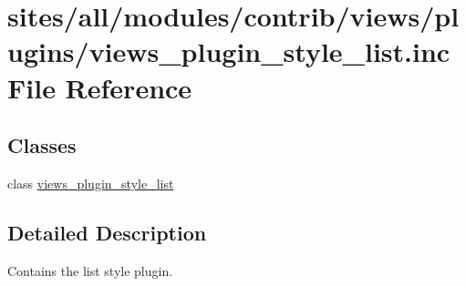 \hypertarget{views__plugin__style__list_8inc}{
\section{sites/all/modules/contrib/views/plugins/views\_\-plugin\_\-style\_\-list.inc File Reference}
\label{views__plugin__style__list_8inc}
}
\subsection*{Classes}
\begin{CompactItemize}
\item 
class \hyperlink{classviews__plugin__style__list}{views\_\-plugin\_\-style\_\-list}
\end{CompactItemize}


\subsection{Detailed Description}
Contains the list style plugin. 